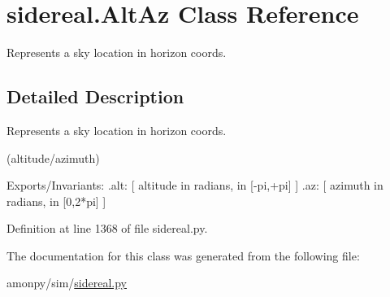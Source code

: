 \hypertarget{classsidereal_1_1_alt_az}{\section{sidereal.\-Alt\-Az Class Reference}
\label{classsidereal_1_1_alt_az}
}


Represents a sky location in horizon coords.  




\subsection{Detailed Description}
Represents a sky location in horizon coords. 

(altitude/azimuth) \begin{DoxyVerb}  Exports/Invariants:
    .alt:   [ altitude in radians, in [-pi,+pi] ]
    .az:    [ azimuth in radians, in [0,2*pi] ]\end{DoxyVerb}
 

Definition at line 1368 of file sidereal.\-py.



The documentation for this class was generated from the following file\-:\begin{DoxyCompactItemize}
\item 
amonpy/sim/\hyperlink{sidereal_8py}{sidereal.\-py}\end{DoxyCompactItemize}
